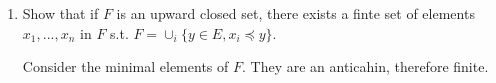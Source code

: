 \documentclass[a4paper,11pt]{exam}
\newcommand{\Z}{\mathbb{Z}}
\newcommand{\N}{\mathbb{N}}
\begin{document}
\begin{questions}
\begin{enumerate}
\begin{enumerate}
				\item Show that if $F$ is an upward closed set, there exists a finte set of elements  $x_1,...,x_n$ in $F$ s.t. $F = \cup_i \{y\in E, x_i \preccurlyeq y\}$.
				\begin{solution}
					Consider the minimal elements of $F$. They are an anticahin, therefore finite.
				\end{solution}
			\end{enumerate}
		\end{enumerate}

\end{questions}
\end{document}
